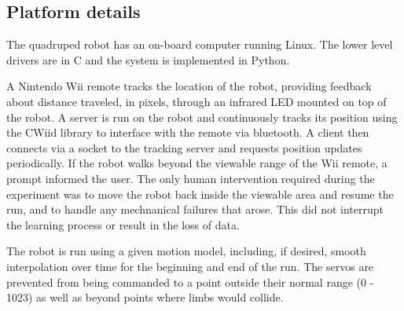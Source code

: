 \subsection{Platform details}












The quadruped robot has an on-board computer running Linux. The lower
level drivers are in C and the system is implemented in
Python. 


A Nintendo Wii remote tracks the location of the robot, providing feedback
about distance traveled, in pixels, through an infrared LED mounted on top of 
the robot. A server is run on the robot and continuously tracks its
position using the CWiid library\cite{cwiid} to interface with the remote
via bluetooth. A client then connects via a socket to the tracking
server and requests position updates periodically. If the robot walks 
beyond the viewable range of the Wii remote, a prompt informed the
user. The only human intervention required during the
experiment was to move the robot back inside the viewable area and resume
the run, and to handle any mechnanical failures that arose. This did not
interrupt the learning process or result in the loss of data.

The robot is run using a given motion model, including, if desired, 
smooth interpolation over time for the beginning and end of the run. 
The servos are prevented from being commanded to a point outside their
normal range (0 - 1023) as well as beyond points where limbs would collide.
